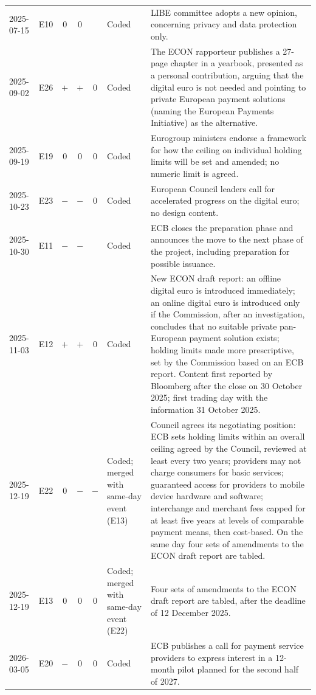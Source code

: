 \begin{longtable}{P{1.55cm}P{0.5cm}ccc P{2.6cm} P{6.0cm}}
2025-07-15 & E10 & $0$ & $0$ &  & Coded & LIBE committee adopts a new opinion, concerning privacy and data protection only. \\
2025-09-02 & E26 & $+$ & $+$ & $0$ & Coded & The ECON rapporteur publishes a 27-page chapter in a yearbook, presented as a personal contribution, arguing that the digital euro is not needed and pointing to private European payment solutions (naming the European Payments Initiative) as the alternative. \\
2025-09-19 & E19 & $0$ & $0$ & $0$ & Coded & Eurogroup ministers endorse a framework for how the ceiling on individual holding limits will be set and amended; no numeric limit is agreed. \\
2025-10-23 & E23 & $-$ & $-$ & $0$ & Coded & European Council leaders call for accelerated progress on the digital euro; no design content. \\
2025-10-30 & E11 & $-$ & $-$ &  & Coded & ECB closes the preparation phase and announces the move to the next phase of the project, including preparation for possible issuance. \\
2025-11-03 & E12 & $+$ & $+$ & $0$ & Coded & New ECON draft report: an offline digital euro is introduced immediately; an online digital euro is introduced only if the Commission, after an investigation, concludes that no suitable private pan-European payment solution exists; holding limits made more prescriptive, set by the Commission based on an ECB report. Content first reported by Bloomberg after the close on 30 October 2025; first trading day with the information 31 October 2025. \\
2025-12-19 & E22 & $0$ & $-$ & $-$ & Coded; merged with same-day event (E13) & Council agrees its negotiating position: ECB sets holding limits within an overall ceiling agreed by the Council, reviewed at least every two years; providers may not charge consumers for basic services; guaranteed access for providers to mobile device hardware and software; interchange and merchant fees capped for at least five years at levels of comparable payment means, then cost-based. On the same day four sets of amendments to the ECON draft report are tabled. \\
2025-12-19 & E13 & $0$ & $0$ & $0$ & Coded; merged with same-day event (E22) & Four sets of amendments to the ECON draft report are tabled, after the deadline of 12 December 2025. \\
2026-03-05 & E20 & $-$ & $0$ & $0$ & Coded & ECB publishes a call for payment service providers to express interest in a 12-month pilot planned for the second half of 2027. \\

\end{longtable}
